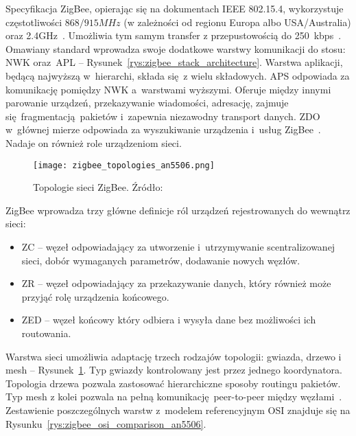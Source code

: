 Specyfikacja ZigBee, opierając się na dokumentach IEEE 802.15.4, wykorzystuje częstotliwości
$868/915 MHz$ (w zależności od regionu Europa albo USA/Australia) oraz 2.4GHz~\cite{zigbee_alliance_zigbee_2017}.
Umożliwia tym samym transfer z przepustowością do 250~kbps~\cite{silicon_laboratories_ug10302_2021}.
Omawiany standard wprowadza swoje dodatkowe warstwy komunikacji do stosu: \gls{NWK} oraz~\gls{APL} --
Rysunek~\ref{rys:zigbee_stack_architecture}.
Warstwa aplikacji, będącą najwyższą w~hierarchi, składa się z wielu składowych. \gls{APS} odpowiada za
komunikację pomiędzy \gls{NWK} a~warstwami wyższymi. Oferuje między innymi parowanie urządzeń,
przekazywanie wiadomości, adresację, zajmuje się fragmentacją pakietów i~zapewnia niezawodny transport danych.
\gls{ZDO} w~głównej mierze odpowiada za wyszukiwanie urządzenia i~usług ZigBee~\cite{stmicroelectronics_an5506_2020, zigbee_alliance_zigbee_2017}.
Nadaje on również role urządzeniom sieci.

\begin{figure}[!ht]
	\centering \texttt{[image: zigbee\_topologies\_an5506.png]}
	\caption{Topologie sieci ZigBee. Źródło:~\cite{stmicroelectronics_an5506_2020}}
	\label{rys:zigbee_topologies_an5506}
\end{figure}

ZigBee wprowadza trzy główne definicje ról urządzeń rejestrowanych do wewnątrz sieci:
\begin{itemize}
\item \gls{ZC} -- węzeł odpowiadający za utworzenie i~utrzymywanie scentralizowanej sieci, dobór wymaganych parametrów, dodawanie nowych węzłów.
\item \gls{ZR} -- węzeł odpowiadający za przekazywanie danych, który również może przyjąć rolę urządzenia końcowego. 
\item \gls{ZED} -- węzeł końcowy który odbiera i wysyła dane bez możliwości ich routowania.
\end{itemize}

Warstwa sieci umożliwia adaptację trzech rodzajów topologii: gwiazda, drzewo i mesh -- Rysunek~\ref{rys:zigbee_topologies_an5506}.
Typ gwiazdy kontrolowany jest przez jednego koordynatora. Topologia drzewa pozwala zastosować hierarchiczne
sposoby routingu pakietów. Typ mesh z kolei pozwala na pełną komunikację peer-to-peer między węzłami~\cite{zigbee_alliance_zigbee_2017}.
Zestawienie poszczególnych warstw z~modelem referencyjnym OSI znajduje się na Rysunku~\ref{rys:zigbee_osi_comparison_an5506}.

